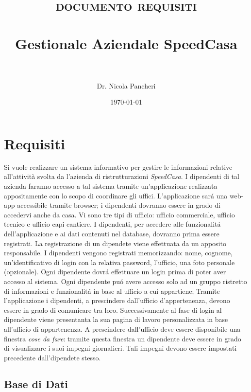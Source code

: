 \documentclass[paper=a4, fontsize=11pt]{scrartcl} %
\title{
\normalfont \normalsize
\textsc{documento requisiti} \\ [25pt] %
\horrule{0.5pt} \\[0.4cm] %
\huge Gestionale Aziendale SpeedCasa \\ %
\horrule{2pt} \\[0.5cm] %
}
\author{Dr. Nicola Pancheri}
\date{\normalsize\today} %
\numberwithin{equation}{section} %
\numberwithin{figure}{section} %
\numberwithin{table}{section} %
\begin{document}
\maketitle %

\section{Requisiti}


Si vuole realizzare un sistema informativo per gestire le informazioni relative all’attività svolta da
l’azienda di ristrutturazioni \textit{SpeedCasa}.
I dipendenti di tal azienda faranno accesso a tal sistema tramite
un'applicazione realizzata appositamente con lo scopo di coordinare gli uffici.
L'applicazione sar\'a una web-app accessibile tramite browser; i dipendenti
dovranno essere in grado di accedervi anche da casa.
Vi sono tre tipi di ufficio: ufficio commerciale, ufficio tecnico e ufficio capi cantiere.
I dipendenti, per accedere alle funzionalit\'a dell'applicazione e ai dati contenuti
nel database, dovranno prima essere registrati.
La registrazione di un dipendete viene effettuata da un apposito responsabile.
I dipendenti vengono registrati memorizzando: nome, cognome, un'identificativo di login con
la relativa password, l'ufficio, una foto personale (opzionale).
Ogni dipendente dovr\'a effettuare un login prima di poter aver accesso al sistema.
Ogni dipendente pu\'o avere accesso solo ad un gruppo ristretto di informazioni e funzionalit\'a
in base al ufficio a cui appartiene;
Tramite l'applicazione i dipendenti, a prescindere dall'ufficio d'appertenenza, devono essere
in grado di comunicare tra loro.
Successivamente al fase di login al dipendente viene presentanta la sua pagina di lavoro
personalizzata in base all'ufficio di appartenenza.
A prescindere dall'ufficio deve essere disponibile una finestra \textit{cose da fare}:
tramite questa finestra un dipendente deve essere in grado di visualizzare
i suoi impegni giornalieri. Tali impegni devono essere impostati precedente
dall'dipendete stesso.


\subsection{Base di Dati}

\begin{align}

\end{align}
\end{document}
